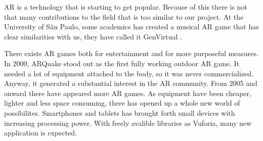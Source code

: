 \gls{AR} is a technology that is starting to get popular. Because of this there
is not that many contributions to the field that is too similar to our project.
At the University of S\~{a}n Paulo, some academics has created a musical AR game
that has clear similarities with us, they have called it GenVirtual
\cite{GenVirtual}. 

There exists AR games both for entertainment and for more purposeful
measures\cite{tan2010augmented}. In 2000, ARQuake stood out as the first fully
working outdoor AR game. It needed a lot of equipment attached to the body, so
it was never commercialized. Anyway, it generated a substantial interest in the
AR community. From 2005 and onward there have appeared more AR games. As
equipment have been cheaper, lighter and less space consuming, there has opened
up a whole new world of possibilites. Smartphones and tablets has brought forth
small devices with increasing processing power. With freely avalible libraries
as \gls{Vuforia}, many new application is expected.